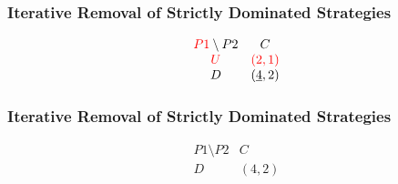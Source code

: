 \begin{frame}
    \frametitle{Iterative Removal of Strictly Dominated Strategies}
    \begin{equation*}
        \begin{matrix}
            \textcolor{red}{P1}\setminus P2 & C \\
            \textcolor{red}{U} & \textcolor{red}{(2,1)} \\
            D & (\underline{4},2) \\
        \end{matrix}
    \end{equation*}
\end{frame}


\begin{frame}
    \frametitle{Iterative Removal of Strictly Dominated Strategies}
    \begin{equation*}
        \begin{matrix}
            P1\setminus P2 & C \\
            D & (4,2) \\
        \end{matrix}
    \end{equation*}
\end{frame}